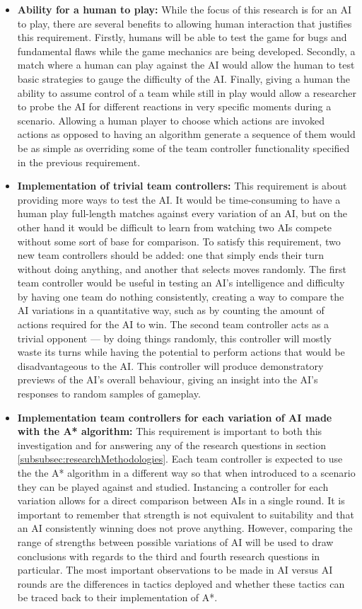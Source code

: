 \documentclass[11pt, a4paper]{article}
\begin{document}
\begin{itemize}
\item \textbf{Ability for a human to play:}
While the focus of this research is for an AI to play, there are several benefits to allowing human interaction that justifies this requirement. Firstly, humans will be able to test the game for bugs and fundamental flaws while the game mechanics are being developed. Secondly, a match where a human can play against the AI would allow the human to test basic strategies to gauge the difficulty of the AI. Finally, giving a human the ability to assume control of a team while still in play would allow a researcher to probe the AI for different reactions in very specific moments during a scenario. Allowing a human player to choose which actions are invoked actions as opposed to having an algorithm generate a sequence of them would be as simple as overriding some of the team controller functionality specified in the previous requirement.

\item \textbf{Implementation of trivial team controllers:}
This requirement is about providing more ways to test the AI. It would be time-consuming to have a human play full-length matches against every variation of an AI, but on the other hand it would be difficult to learn from watching two AIs compete without some sort of base for comparison. To satisfy this requirement, two new team controllers should be added: one that simply ends their turn without doing anything, and another that selects moves randomly. The first team controller would be useful in testing an AI's intelligence and difficulty by having one team do nothing consistently, creating a way to compare the AI variations in a quantitative way, such as by counting the amount of actions required for the AI to win. The second team controller acts as a trivial opponent --- by doing things randomly, this controller will mostly waste its turns while having the potential to perform actions that would be disadvantageous to the AI. This controller will produce demonstratory previews of the AI's overall behaviour, giving an insight into the AI's responses to random samples of gameplay.

\item \textbf{Implementation team controllers for each variation of AI made with the A* algorithm:}
This requirement is important to both this investigation and for answering any of the research questions in section \ref{subsubsec:researchMethodologies}. Each team controller is expected to use the the A* algorithm in a different way so that when introduced to a scenario they can be played against and studied. Instancing a controller for each variation allows for a direct comparison between AIs in a single round. It is important to remember that strength is not equivalent to suitability and that an AI consistently winning does not prove anything. However, comparing the range of strengths between possible variations of AI will be used to draw conclusions with regards to the third and fourth research questions in particular. The most important observations to be made in AI versus AI rounds are the differences in tactics deployed and whether these tactics can be traced back to their implementation of A*.


\end{itemize}
\end{document}
